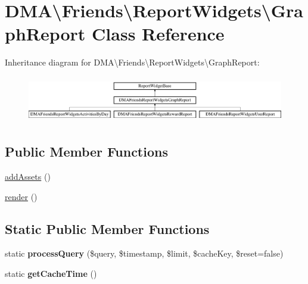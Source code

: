 \hypertarget{classDMA_1_1Friends_1_1ReportWidgets_1_1GraphReport}{}\section{D\+M\+A\textbackslash{}Friends\textbackslash{}Report\+Widgets\textbackslash{}Graph\+Report Class Reference}
\label{classDMA_1_1Friends_1_1ReportWidgets_1_1GraphReport}
Inheritance diagram for D\+M\+A\textbackslash{}Friends\textbackslash{}Report\+Widgets\textbackslash{}Graph\+Report\+:\begin{figure}[H]
\begin{center}
\leavevmode
\includegraphics[height=2.043796cm]{d1/d31/classDMA_1_1Friends_1_1ReportWidgets_1_1GraphReport}
\end{center}
\end{figure}
\subsection*{Public Member Functions}
\begin{DoxyCompactItemize}
\item 
\hyperlink{classDMA_1_1Friends_1_1ReportWidgets_1_1GraphReport_a750a6e7451bc98f22bdb38e3ad091bb7}{add\+Assets} ()
\item 
\hyperlink{classDMA_1_1Friends_1_1ReportWidgets_1_1GraphReport_aa4842f4491c6ea5b784b99a58fbc9b42}{render} ()
\end{DoxyCompactItemize}
\subsection*{Static Public Member Functions}
\begin{DoxyCompactItemize}
\item 
\hypertarget{classDMA_1_1Friends_1_1ReportWidgets_1_1GraphReport_a8158cf12d275e22339d81d206198c83f}{}static {\bfseries process\+Query} (\$query, \$timestamp, \$limit, \$cache\+Key, \$reset=false)\label{classDMA_1_1Friends_1_1ReportWidgets_1_1GraphReport_a8158cf12d275e22339d81d206198c83f}

\item 
\hypertarget{classDMA_1_1Friends_1_1ReportWidgets_1_1GraphReport_a962b22135548ef899e10abd936d5f0ba}{}static {\bfseries get\+Cache\+Time} ()\label{classDMA_1_1Friends_1_1ReportWidgets_1_1GraphReport_a962b22135548ef899e10abd936d5f0ba}

\end{DoxyCompactItemize}
